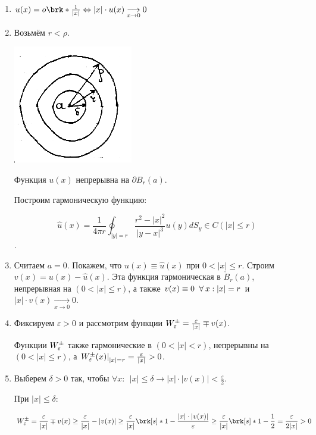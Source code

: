 \begin{enumerate}
\item{ 
	
	$u(x) = o \brk*{\frac{1}{|x|}} \Leftrightarrow |x| \cdot u(x) 
	\underset{x \to 0}{\longrightarrow} 0$
}

\item{
Возьмём $r<\rho$. 
\begin{center}
\includegraphics{21_3_new}
\end{center}
Функция $u(x)$ непрерывна на $\partial B_r (a)$.

Построим гармоническую функцию:

$$\hat{u}(x) = \frac{1}{4 \pi r} 
\oint_{|y|=r}\frac{r^2 - |x|^2}{|y-x|^3} u(y) dS_y \in 
C(|x| \le r)$$.

}


\item{

Считаем $a=0$. Покажем, что $u(x) \equiv \hat{u}(x)$ при $0<|x|\le r$. Строим $v(x) = u(x) - \hat{u}(x)$. Эта функция гармоническая в $\mathring{B}_r(a)$, непрерывная на $(0<|x| \le r)$, а также 
$v(x) \equiv 0 \;\;\forall\: x: |x|=r$ и $|x| \cdot v(x) \underset{x \to 0}{\longrightarrow} 0$. 
 
}

\item{

Фиксируем $\varepsilon >0$ и рассмотрим функции $W_\varepsilon^{\pm} =
\frac{\varepsilon}{|x|} \mp v(x)$.

Функции $W_\varepsilon^{\pm}$ также гармонические в $(0<|x|<r)$, непрерывны на $(0<|x| \le r)$, а 
$\left.W_\varepsilon^{\pm}(x) \right|_{|x|=r} =\frac{\varepsilon}{|x|} >0$.
}

\item{

Выберем $\delta > 0 $ так, чтобы $\forall x:~~ |x| \le \delta \to |x| \cdot |v(x)| < \frac{\varepsilon}{2}$.

При $|x|\le \delta$: 

$$
W_\varepsilon^{\pm} = \frac{\eps}{|x|} \mp v(x) \ge 
\frac{\eps}{|x|} - |v(x)|
\ge 
\frac{\eps}{|x|}\brk[s]*{1 - \frac{|x|\cdot |v(x)|}{\varepsilon}}
\ge
\frac{\eps}{|x|}\brk[s]*{1-\frac{1}{2}}
=
\frac{\varepsilon}{2|x|} >0
$$
}




\end{enumerate}
